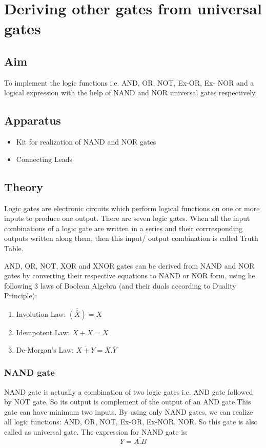 \chapter{Deriving other gates from universal gates}

\section{Aim}
	To implement the logic functions i.e. AND, OR, NOT, Ex-OR, Ex- NOR and a logical expression with the help of NAND and NOR universal gates respectively.

\section{Apparatus}
	\begin{itemize}
		\tightlist
		\item Kit for realization of NAND and NOR gates
		\item Connecting Leads
	\end{itemize}

\section{Theory}
	Logic gates are electronic circuits which perform logical functions on one or more inputs to produce one output. There are seven logic gates. When all the input combinations of a logic gate are written in a series and their corrresponding outputs written along them, then this input/ output combination is called Truth Table.
	
	AND, OR, NOT, XOR and XNOR gates can be derived from NAND and NOR gates by converting their respective equations to NAND or NOR form, using he following 3 laws of Boolean Algebra (and their duals according to Duality Principle):
	\begin{enumerate}
		\tightlist
		\item Involution Law: $\overline{(\overline{X})} = X$
		\item Idempotent Law: $X + X = X$
		\item De-Morgan's Law: $\overline{X+Y} = \overline{X} . \overline{Y}$
	\end{enumerate}
	
	\subsection{NAND gate}
		NAND gate is actually a combination of two logic gates i.e. AND gate followed by NOT gate. So its output is complement of the output of an AND gate.This gate can have minimum two inputs. By using only NAND gates, we can realize all logic functions: AND, OR, NOT, Ex-OR, Ex-NOR, NOR. So this gate is also called as universal gate.
		The expression for NAND gate is:
		$$Y = \overline{A.B}$$
